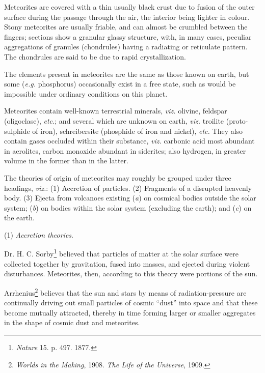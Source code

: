\documentclass[a4paper, 12pt, oneside]{article}
\begin{document}
Meteorites are covered with a thin usually black crust due to fusion of the outer surface during the passage through the air, the interior being lighter in colour. Stony meteorites are usually friable, and can almost be crumbled between the fingers; sections show a granular glassy structure, with, in many cases, peculiar aggregations of granules (chondrules) having a radiating or reticulate pattern. The chondrules are said to be due to rapid crystallization.

The elements present in meteorites are the same as those known on earth, but some (\emph{e.g.} phosphorus) occasionally exist in a free state, such as would be impossible under ordinary conditions on this planet.

Meteorites contain well-known terrestrial minerals, \emph{viz.} olivine, feldspar (oligoclase), \emph{etc.}; and several which are unknown on earth, \emph{viz.} troilite (proto-sulphide of iron), schreibersite (phosphide of iron and nickel), \emph{etc.} They also contain gases occluded within their substance, \emph{viz.} carbonic acid most abundant in aerolites, carbon monoxide abundant in siderites; also hydrogen, in greater volume in the former than in the latter.

The theories of origin of meteorites may roughly be grouped under three headings, \emph{viz.}:  
(1) Accretion of particles.  
(2) Fragments of a disrupted heavenly body.  
(3) Ejecta from volcanoes existing (\emph{a}) on cosmical bodies outside the solar system; (\emph{b}) on bodies within the solar system (excluding the earth); and (\emph{c}) on the earth.

(1) \emph{Accretion theories}.

Dr. H. C. Sorby\footnote{\emph{Nature} 15. p. 497. 1877.} believed that particles of matter at the solar surface were collected together by gravitation, fused into masses, and ejected during violent disturbances. Meteorites, then, according to this theory were portions of the sun.

Arrhenius\footnote{\emph{Worlds in the Making}, 1908. \emph{The Life of the Universe}, 1909.} believes that the sun and stars by means of radiation-pressure are continually driving out small particles of cosmic ``dust'' into space and that these become mutually attracted, thereby in time forming larger or smaller aggregates in the shape of cosmic dust and meteorites.
\end{document}

